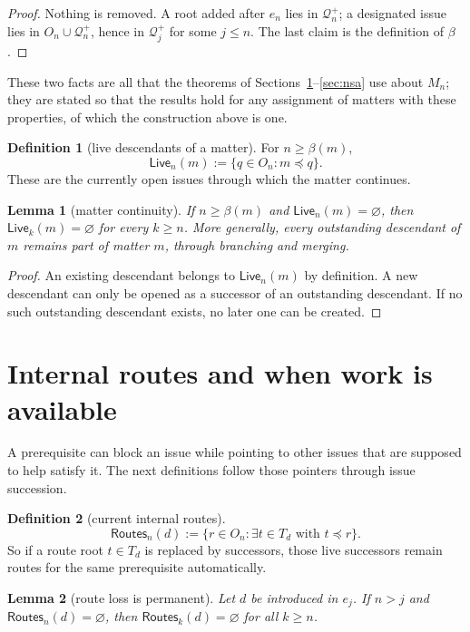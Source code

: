 \documentclass[11pt]{article}
\newtheorem{lemma}{Lemma}
\theoremstyle{definition}
\newtheorem*{definition}{Definition}
\theoremstyle{remark}
\newcommand{\Live}{\mathsf{Live}}
\newcommand{\Routes}{\mathsf{Routes}}
\newcommand{\Born}{\mathcal Q^{+}}
\begin{document}
\begin{proof}
Nothing is removed. A root added after $e_n$ lies in $\Born_n$; a designated
issue lies in $O_n\cup\Born_n$, hence in $\Born_j$ for some $j\le n$. The last
claim is the definition of $\beta$.
\end{proof}

These two facts are all that the theorems of Sections~\ref{sec:work}--\ref{sec:nsa}
use about $M_n$; they are stated so that the results hold for any assignment of
matters with these properties, of which the construction above is one.

\begin{definition}[live descendants of a matter]
For $n\ge\beta(m)$,
\[
 \Live_n(m):=\{q\in O_n:m\preceq q\}.
\]
These are the currently open issues through which the matter continues.
\end{definition}

\begin{lemma}[matter continuity]\label{lem:matter-continuity}
If $n\ge\beta(m)$ and $\Live_n(m)=\varnothing$, then
$\Live_k(m)=\varnothing$ for every $k\ge n$. More generally, every outstanding
descendant of $m$ remains part of matter $m$, through branching and merging.
\end{lemma}

\begin{proof}
An existing descendant belongs to $\Live_n(m)$ by definition. A new descendant
can only be opened as a successor of an outstanding descendant. If no such
outstanding descendant exists, no later one can be created.
\end{proof}

\section{Internal routes and when work is available}\label{sec:work}

A prerequisite can block an issue while pointing to other issues that are
supposed to help satisfy it. The next definitions follow those pointers through
issue succession.

\begin{definition}[current internal routes]
\[
 \Routes_n(d):=\{r\in O_n:\exists t\in T_d\text{ with }t\preceq r\}.
\]
So if a route root $t\in T_d$ is replaced by successors, those live successors
remain routes for the same prerequisite automatically.
\end{definition}

\begin{lemma}[route loss is permanent]\label{lem:route-extinction}
Let $d$ be introduced in $e_j$. If $n>j$ and $\Routes_n(d)=\varnothing$, then
$\Routes_k(d)=\varnothing$ for all $k\ge n$.
\end{lemma}
\end{document}
